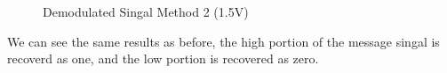 \documentclass[12pt]{article}
\begin{document}
\begin{figure}[H]
    \centering
    \caption{Demodulated Singal Method 2 (1.5V)}
\end{figure}
We can see the same results as before, the high portion of the message singal is recoverd as one, and the low portion is recovered as zero.
\end{document}
